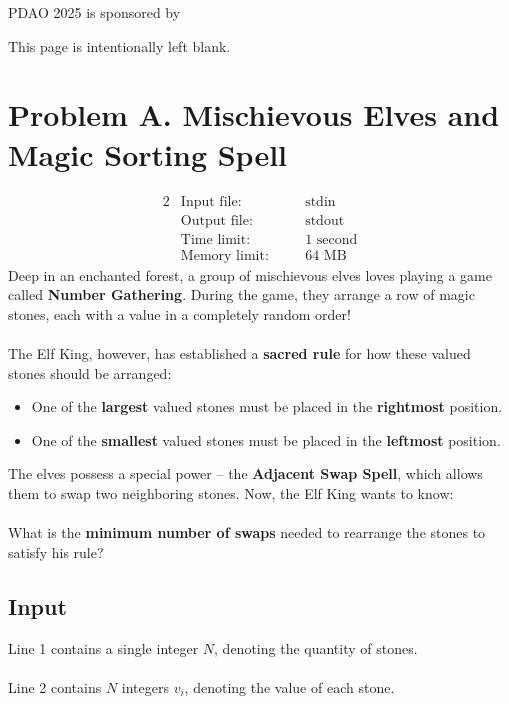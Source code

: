 \documentclass[12pt,a4paper]{article}
\newcommand*{\blankpage}{%
\newpage
\vspace*{\fill}
{\centering \huge This page is intentionally left blank.\par}
\vspace{\fill}
\newpage}
\begin{document}
\noindent\vfill
\hfill {\fontsize{13pt}{1cm}PDAO 2025 is sponsored by }

\blankpage

\section*{\fontsize{18}{12}Problem A. Mischievous Elves and Magic Sorting Spell}

\begin{alignat*} {2}
 &   \text{Input file:}   \quad     &&\text{stdin}\\
 &   \text{Output file:}  \quad     &&\text{stdout}\\
 &   \text{Time limit:}   \quad     &&\text{1 second}\\
 &   \text{Memory limit:} \quad     &&\text{64 MB}
\end{alignat*}
\noindent
Deep in an enchanted forest, a group of mischievous elves loves playing a game called \textbf{Number Gathering}. During the game, they arrange a row of magic stones, each with a value in a completely random order!
\\\\
\noindent
The Elf King, however, has established a \textbf{sacred rule} for how these valued stones should be arranged:

\begin{itemize}
    \item One of the \textbf{largest} valued stones must be placed in the \textbf{rightmost} position.
    \item One of the \textbf{smallest} valued stones must be placed in the \textbf{leftmost} position.
\end{itemize}

\noindent
The elves possess a special power -- the \textbf{Adjacent Swap Spell}, which allows them to swap two neighboring stones. Now, the Elf King wants to know:
\\\\
\noindent
What is the \textbf{minimum number of swaps} needed to rearrange the stones to satisfy his rule?

\subsection*{\fontsize{16}{12}Input}
Line 1 contains a single integer $N$, denoting the quantity of stones. \\\\
Line 2 contains $N$ integers $v_i$, denoting the value of each stone. 
\end{document}
